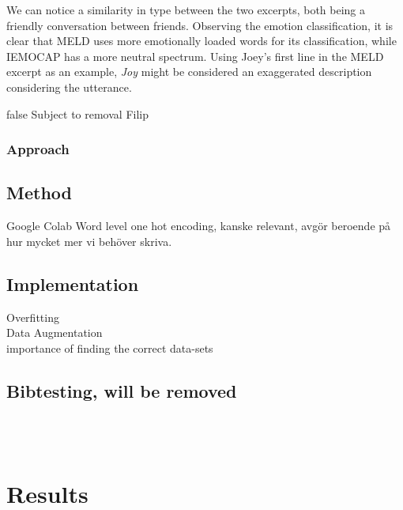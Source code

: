 \documentclass[nofilelist]{cslthse-msc}
\begin{document}
We can notice a similarity in type between the two excerpts, both being a friendly conversation between friends. Observing the emotion classification, it is clear that MELD uses more emotionally loaded words for its classification, while IEMOCAP has a more neutral spectrum. Using Joey's first line in the MELD excerpt as an example, \textit{Joy} might be considered an exaggerated description considering the utterance. 









\ifx false
Subject to removal
Filip
\subsection{Approach} 
\section{Method}
Google Colab
Word level one hot encoding, kanske relevant, avgör beroende på hur mycket mer vi behöver skriva.
\section{Implementation}
Overfitting \\
Data Augmentation \\
importance of finding the correct data-sets \\
\section{Bibtesting, will be removed}
\citep{emotionlinesdataset} \\
\citep{franoischollet2017learning}\\
\citep{beaver2020towards}

\fi

\chapter{Results}
\label{result_chapter}
\end{document}

